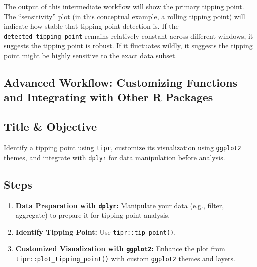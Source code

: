 \documentclass[
  10pt,
  letterpaper,
  DIV=11,
  numbers=noendperiod]{scrartcl}
\providecommand{\tightlist}{%
  \setlength{\itemsep}{0pt}\setlength{\parskip}{0pt}}
\begin{document}
The output of this intermediate workflow will show the primary tipping
point. The ``sensitivity'' plot (in this conceptual example, a rolling
tipping point) will indicate how stable that tipping point detection is.
If the \texttt{detected\_tipping\_point} remains relatively constant
across different windows, it suggests the tipping point is robust. If it
fluctuates wildly, it suggests the tipping point might be highly
sensitive to the exact data subset.

\subsection{Advanced Workflow: Customizing Functions and Integrating
with Other R
Packages}\label{advanced-workflow-customizing-functions-and-integrating-with-other-r-packages}

\subsection{Title \& Objective}\label{title-objective-2}

Identify a tipping point using \texttt{tipr}, customize its
visualization using \texttt{ggplot2} themes, and integrate with
\texttt{dplyr} for data manipulation before analysis.

\subsection{Steps}\label{steps-2}

\begin{enumerate}
\def\labelenumi{\arabic{enumi}.}
\tightlist
\item
  \textbf{Data Preparation with \texttt{dplyr}:} Manipulate your data
  (e.g., filter, aggregate) to prepare it for tipping point analysis.
\item
  \textbf{Identify Tipping Point:} Use \texttt{tipr::tip\_point()}.
\item
  \textbf{Customized Visualization with \texttt{ggplot2}:} Enhance the
  plot from \texttt{tipr::plot\_tipping\_point()} with custom
  \texttt{ggplot2} themes and layers.
\end{enumerate}
\end{document}

